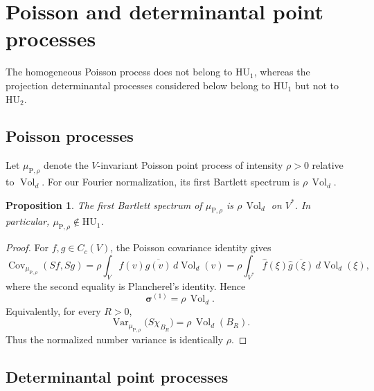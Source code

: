 \documentclass[11pt,reqno,a4paper]{amsart}
\numberwithin{equation}{section}
\theoremstyle{compact}
\newtheorem{proposition}[proposition]{Proposition}
\theoremstyle{definition}
\theoremstyle{definition}
\newcommand{\HU}{\mathrm{HU}}
\newcommand{\Var}{\operatorname{Var}}
\newcommand{\Cov}{\operatorname{Cov}}
\newcommand{\Vol}{\operatorname{Vol}}
\begin{document}
\section{Poisson and determinantal point processes}
\label{sec:determinantal-poisson}

The homogeneous Poisson process does not belong to $\HU_1$, whereas the
projection determinantal processes considered below belong to $\HU_1$ but not
to $\HU_2$.

\subsection{Poisson processes}
\label{subsec:poisson}

Let $\mu_{\mathrm P,\rho}$ denote the $V$-invariant Poisson point process of
intensity $\rho>0$ relative to $\Vol_d$.  For our Fourier normalization, its
first Bartlett spectrum is $\rho\,\Vol_d$.

\begin{proposition}\label{prop:poisson-not-hu1}
The first Bartlett spectrum of $\mu_{\mathrm P,\rho}$ is
$\rho\,\Vol_d$ on $V^*$.  In particular,
$\mu_{\mathrm P,\rho}\notin\HU_1$.
\end{proposition}

\begin{proof}
For $f,g\in C_c(V)$, the Poisson covariance identity gives
\begin{equation}\label{eq:poisson-covariance}
  \Cov_{\mu_{\mathrm P,\rho}}(Sf,Sg)
  =\rho\int_V f(v)\overline{g(v)}\,d\Vol_d(v)
  =\rho\int_{V^*}\widehat f(\xi)
       \overline{\widehat g(\xi)}\,d\Vol_d(\xi),
\end{equation}
where the second equality is Plancherel's identity.  Hence
\begin{equation}\label{eq:poisson-bartlett}
  \boldsymbol\sigma^{(1)}=\rho\,\Vol_d.
\end{equation}
Equivalently, for every $R>0$,
\begin{equation}\label{eq:poisson-number-variance}
  \Var_{\mu_{\mathrm P,\rho}}\big(S\chi_{B_R}\big)
  =\rho\,\Vol_d(B_R).
\end{equation}
Thus the normalized number variance is identically $\rho$.
\end{proof}

\subsection{Determinantal point processes}
\label{subsec:dpp}
\end{document}
